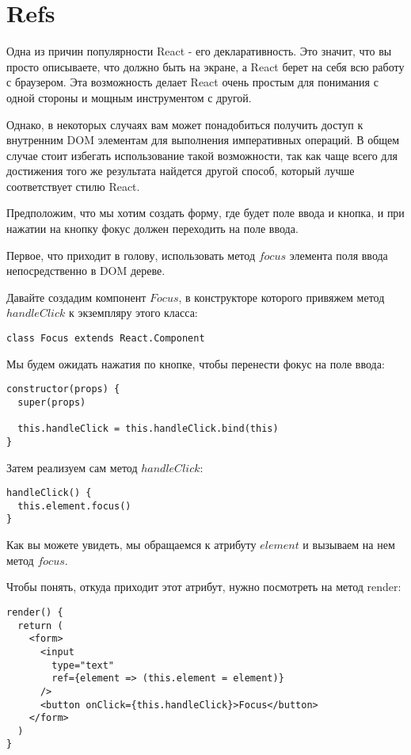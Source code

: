 \section{Refs}

Одна из причин популярности React - его декларативность. Это значит, что вы просто описываете, что должно быть на экране, а React берет на себя всю работу с браузером. Эта возможность делает React очень простым для понимания с одной стороны и мощным инструментом с другой.

Однако, в некоторых случаях вам может понадобиться получить доступ к внутренним DOM элементам для выполнения императивных операций. В общем случае стоит избегать использование такой возможности, так как чаще всего для достижения того же результата найдется другой способ, который лучше соответствует стилю React.

Предположим, что мы хотим создать форму, где будет поле ввода и кнопка, и при нажатии на кнопку фокус должен переходить на поле ввода.

Первое, что приходит в голову, использовать метод $focus$ элемента поля ввода непосредственно в DOM дереве.

Давайте создадим компонент $Focus$, в конструкторе которого привяжем метод $handleClick$ к экземпляру этого класса:

\begin{lstlisting}
class Focus extends React.Component
\end{lstlisting}

Мы будем ожидать нажатия по кнопке, чтобы перенести фокус на поле ввода:

\begin{lstlisting}
constructor(props) {
  super(props)
  
  this.handleClick = this.handleClick.bind(this)
}
\end{lstlisting}

Затем реализуем сам метод $handleClick$:

\begin{lstlisting}
handleClick() {
  this.element.focus()
}
\end{lstlisting}

Как вы можете увидеть, мы обращаемся к атрибуту $element$ и вызываем на нем метод $focus$.

Чтобы понять, откуда приходит этот атрибут, нужно посмотреть на метод render:

\begin{lstlisting}
render() {
  return (
    <form>
      <input
        type="text"
        ref={element => (this.element = element)}
      />
      <button onClick={this.handleClick}>Focus</button>
    </form>
  )
}
\end{lstlisting}


